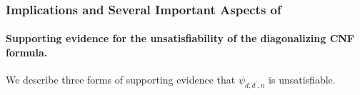 \documentclass[11pt,letter]{article}
\theoremstyle{remark} %
\begin{document}

 
\subsubsection{Implications and Several Important Aspects of }



\paragraph{Supporting evidence for the unsatisfiability of the diagonalizing CNF formula.}
We describe three forms of supporting evidence that $\psi_{d,d^\prime,n}$ is unsatisfiable.

\medskip 
\end{document}
